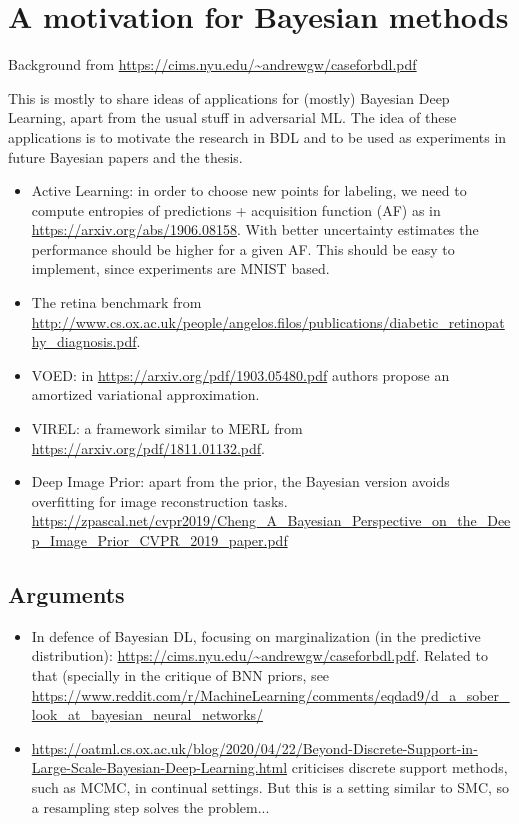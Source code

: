 
\section{A motivation for Bayesian methods}

Background from \url{https://cims.nyu.edu/~andrewgw/caseforbdl.pdf}

This is mostly to share ideas of applications for (mostly) Bayesian Deep Learning, apart from the usual stuff in adversarial ML. The idea of these applications is to motivate the research in BDL and to be used as experiments in future Bayesian papers and the thesis.

\begin{itemize}
    \item Active Learning: in order to choose new points for labeling, we need to compute entropies of predictions + acquisition function (AF) as in \url{https://arxiv.org/abs/1906.08158}. With better uncertainty estimates the performance should be higher for a given AF. This should be easy to implement, since experiments are MNIST based.
    \item The retina benchmark from \url{http://www.cs.ox.ac.uk/people/angelos.filos/publications/diabetic_retinopathy_diagnosis.pdf}.
    \item VOED: in \url{https://arxiv.org/pdf/1903.05480.pdf} authors propose an amortized variational approximation.
    \item VIREL: a framework similar to MERL from \url{https://arxiv.org/pdf/1811.01132.pdf}.
    \item Deep Image Prior: apart from the prior, the Bayesian version avoids overfitting for image reconstruction tasks. \url{https://zpascal.net/cvpr2019/Cheng_A_Bayesian_Perspective_on_the_Deep_Image_Prior_CVPR_2019_paper.pdf}
\end{itemize}

\subsection{Arguments}

\begin{itemize}
    \item In defence of Bayesian DL, focusing on marginalization (in the predictive distribution): \url{https://cims.nyu.edu/~andrewgw/caseforbdl.pdf}. Related to that (specially in the critique of BNN priors, see \url{https://www.reddit.com/r/MachineLearning/comments/eqdad9/d_a_sober_look_at_bayesian_neural_networks/}
    
    \item \url{https://oatml.cs.ox.ac.uk/blog/2020/04/22/Beyond-Discrete-Support-in-Large-Scale-Bayesian-Deep-Learning.html} criticises discrete support methods, such as MCMC, in continual settings. But this is a setting similar to SMC, so a resampling step solves the problem...
\end{itemize}

